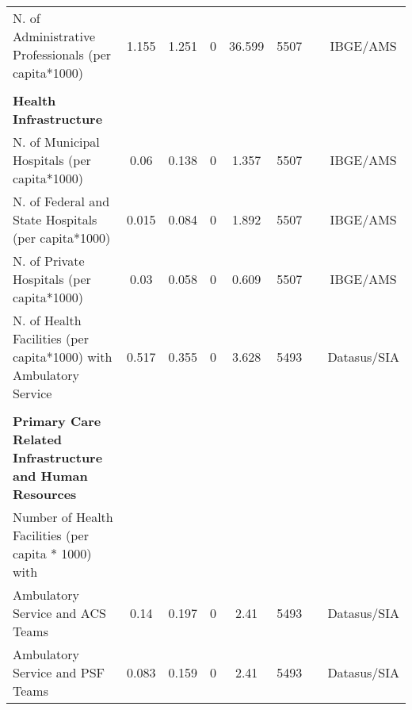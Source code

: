\begin{table}[H]
\begin{footnotesize}
\begin{center}
{\begin{threeparttable}[b]
\begin{tabular}{rrrrrrrr}
    \multicolumn{1}{l}{N. of Administrative Professionals (per capita*1000)} & \multicolumn{1}{c}{1.155} & \multicolumn{1}{c}{1.251} & \multicolumn{1}{c}{0} & \multicolumn{1}{c}{36.599} & \multicolumn{1}{c}{5507} &       & \multicolumn{1}{c}{IBGE/AMS} \\
          &       &       &       &       &       &       &  \\
    \multicolumn{1}{l}{\textbf{Health Infrastructure}} &       &       &       &       &       &       &  \\
    \multicolumn{1}{l}{N. of Municipal Hospitals (per capita*1000)} & \multicolumn{1}{c}{0.06} & \multicolumn{1}{c}{0.138} & \multicolumn{1}{c}{0} & \multicolumn{1}{c}{1.357} & \multicolumn{1}{c}{5507} &       & \multicolumn{1}{c}{IBGE/AMS} \\
    \multicolumn{1}{l}{N. of Federal and State Hospitals (per capita*1000)} & \multicolumn{1}{c}{0.015} & \multicolumn{1}{c}{0.084} & \multicolumn{1}{c}{0} & \multicolumn{1}{c}{1.892} & \multicolumn{1}{c}{5507} &       & \multicolumn{1}{c}{IBGE/AMS} \\
    \multicolumn{1}{l}{N. of Private Hospitals (per capita*1000)} & \multicolumn{1}{c}{0.03} & \multicolumn{1}{c}{0.058} & \multicolumn{1}{c}{0} & \multicolumn{1}{c}{0.609} & \multicolumn{1}{c}{5507} &       & \multicolumn{1}{c}{IBGE/AMS} \\
    \multicolumn{1}{l}{N. of Health Facilities (per capita*1000) with Ambulatory Service} & \multicolumn{1}{c}{0.517} & \multicolumn{1}{c}{0.355} & \multicolumn{1}{c}{0} & \multicolumn{1}{c}{3.628} & \multicolumn{1}{c}{5493} &       & \multicolumn{1}{c}{Datasus/SIA} \\
          &       &       &       &       &       &       &  \\
    \multicolumn{1}{l}{\textbf{Primary Care Related Infrastructure and Human Resources}} &       &       &       &       &       &       &  \\
    \multicolumn{1}{l}{Number of Health Facilities (per capita * 1000) with} &       &       &       &       &       &       &  \\
    \multicolumn{1}{l}{Ambulatory Service and ACS Teams} & \multicolumn{1}{c}{0.14} & \multicolumn{1}{c}{0.197} & \multicolumn{1}{c}{0} & \multicolumn{1}{c}{2.41} & \multicolumn{1}{c}{5493} &       & \multicolumn{1}{c}{Datasus/SIA} \\
    \multicolumn{1}{l}{Ambulatory Service and PSF Teams} & \multicolumn{1}{c}{0.083} & \multicolumn{1}{c}{0.159} & \multicolumn{1}{c}{0} & \multicolumn{1}{c}{2.41} & \multicolumn{1}{c}{5493} &       & \multicolumn{1}{c}{Datasus/SIA} \\

\end{tabular}
\end{threeparttable}}
\end{center}
\end{footnotesize}
\end{table}
